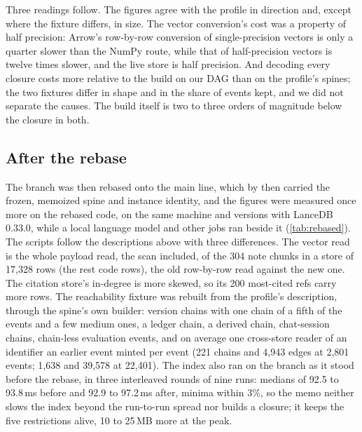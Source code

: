 \documentclass[11pt]{article}
\theoremstyle{plain}
\theoremstyle{definition}
\theoremstyle{remark}
\begin{document}
Three readings follow. The figures agree with the profile in direction and, except where the
fixture differs, in size. The vector conversion's cost was a property of half precision: Arrow's
row-by-row conversion of single-precision vectors is only a quarter slower than the NumPy route,
while that of half-precision vectors is twelve times slower, and the live store is half precision.
And decoding every closure costs more relative to the build on our DAG than on the profile's
spines; the two fixtures differ in shape and in the share of events kept, and we did not separate
the causes. The build itself is two to three orders of magnitude below the closure in both.

\subsection{After the rebase}\label{sec:rebased}
The branch was then rebased onto the main line, which by then carried the frozen, memoized spine and
instance identity, and the figures were measured once more on the rebased code, on the same machine
and versions with LanceDB 0.33.0, while a local language model and other jobs ran beside it
(\cref{tab:rebased}). The scripts follow the descriptions above with three differences. The vector
read is the whole payload read, the scan included, of the 304 note chunks in a store of 17{,}328
rows (the rest code rows), the old row-by-row read against the new one. The citation store's
in-degree is more skewed, so its 200 most-cited refs carry more rows. The reachability fixture was
rebuilt from the profile's description, through the spine's own builder: version chains with one
chain of a fifth of the events and a few medium ones, a ledger chain, a derived chain, chat-session
chains, chain-less evaluation events, and on average one cross-store reader of an identifier an
earlier event minted per event (221 chains and 4{,}943 edges at 2{,}801 events; 1{,}638 and
39{,}578 at 22{,}401). The index also ran on the branch as it stood before the rebase, in three
interleaved rounds of nine runs: medians of 92.5 to 93.8\,ms before and 92.9 to 97.2\,ms after,
minima within 3\%, so the memo neither slows the index beyond the run-to-run spread nor builds a
closure; it keeps the five restrictions alive, 10 to 25\,MB more at the peak.
\end{document}
